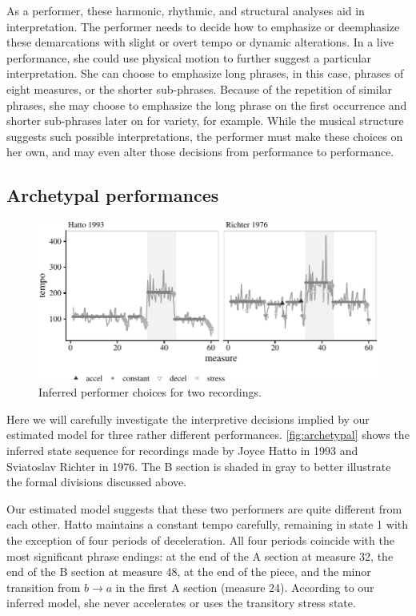 \documentclass[aoas]{imsart}
\begin{document}
As a performer, these harmonic, rhythmic, and structural analyses aid
in interpretation. The performer needs to decide how to emphasize or
deemphasize these demarcations with slight or overt tempo or dynamic
alterations. In a live performance, she could use physical motion to
further suggest a particular interpretation. She can choose to
emphasize long phrases, in this 
case, phrases of eight measures, or the shorter sub-phrases. Because
of the repetition of similar phrases, she may choose to emphasize the
long phrase on the first occurrence and shorter sub-phrases later on
for variety, for example. While the musical structure suggests such
possible interpretations, the performer must make these choices on
her own, and may even alter those decisions from performance to
performance.



\subsection{Archetypal performances}
\label{sec:arch-perf}


\begin{figure}[t]
  \centering
  \includegraphics[width=.9\textwidth]{two-performances-1}
  \caption{Inferred performer choices for two recordings. }
  \label{fig:archetypal}
\end{figure}
Here we will carefully investigate the interpretive
decisions implied by our estimated model for three rather different performances. \autoref{fig:archetypal} shows the inferred state sequence for
recordings made by Joyce Hatto in 1993 and Sviatoslav Richter in
1976. The B section is
shaded in gray to better illustrate the formal divisions discussed above.

Our estimated model suggests that these two performers are quite different
from each other. Hatto maintains a constant tempo carefully, remaining
in state 1 with the exception of four periods of deceleration. All
four periods coincide with the most significant phrase endings: at the
end of the A section at measure 32, the end of the B section at
measure 48, at the end of the piece, and the minor transition from
$b\rightarrow a$ in the first A section (measure 24). According
to our inferred model, she never accelerates or uses the transitory
stress state.
\end{document}
